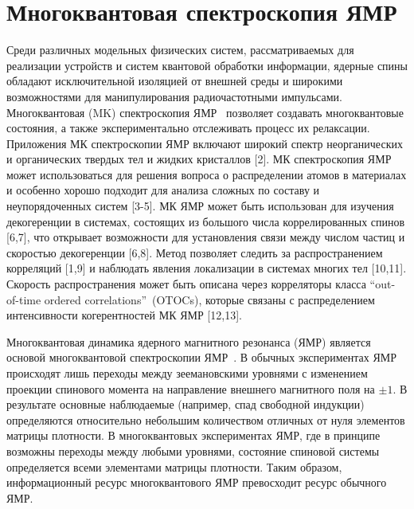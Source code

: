 \section{Многоквантовая спектроскопия ЯМР}
Среди различных модельных физических систем,
рассматриваемых для реализации устройств и систем квантовой обработки информации,
ядерные спины обладают исключительной изоляцией от внешней среды
и широкими возможностями для манипулирования радиочастотными импульсами.
Многоквантовая (MK) спектроскопия ЯМР~\cite{Baum1985} позволяет создавать многоквантовые состояния,
а также экспериментально отслеживать процесс их релаксации.
Приложения МК спектроскопии ЯМР включают широкий спектр неорганических и органических твердых тел и жидких кристаллов [2].
МК спектроскопия ЯМР может использоваться для решения вопроса о распределении атомов в материалах
и особенно хорошо подходит для анализа сложных по составу и неупорядоченных систем [3-5].
МК ЯМР может быть использован для изучения декогеренции в системах,
состоящих из большого числа коррелированных спинов [6,7],
что открывает возможности для установления связи между числом частиц и скоростью декогеренции [6,8].
Метод позволяет следить за распространением корреляций [1,9]
и наблюдать явления локализации в системах многих тел [10,11].
Скорость распространения может быть описана через корреляторы класса ``out-of-time ordered correlations''~(OTOCs),
которые связаны с распределением интенсивности когерентностей МК ЯМР [12,13].


Многоквантовая динамика ядерного магнитного резонанса (ЯМР) является основой многоквантовой спектроскопии ЯМР~\cite{Baum1985}.
В обычных экспериментах ЯМР происходят лишь переходы между зеемановскими уровнями
с изменением проекции спинового момента на направление внешнего магнитного поля на $\pm 1$.
В результате основные наблюдаемые (например, спад свободной индукции) определяются относительно небольшим количеством отличных от нуля элементов матрицы плотности.
В многоквантовых экспериментах ЯМР,
где в принципе возможны переходы между любыми уровнями,
состояние спиновой системы определяется всеми элементами матрицы плотности.
Таким образом, информационный ресурс многоквантового ЯМР превосходит ресурс обычного ЯМР.

